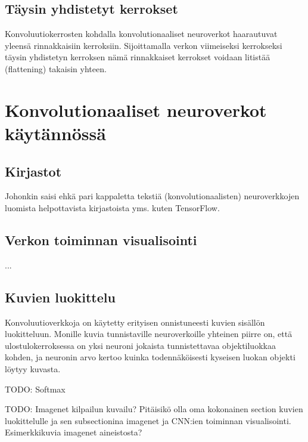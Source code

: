 \documentclass[finnish]{tktltiki2}
\theoremstyle{definition}
\theoremstyle{remark}
\begin{document}
    \subsection{Täysin yhdistetyt kerrokset}
    Konvoluutiokerrosten kohdalla konvolutionaaliset neuroverkot haarautuvat yleensä rinnakkaisiin kerroksiin. Sijoittamalla verkon viimeiseksi kerrokseksi täysin yhdistetyn kerroksen nämä rinnakkaiset kerrokset voidaan litistää (flattening) takaisin yhteen.

  \section{Konvolutionaaliset neuroverkot käytännössä}

    \subsection{Kirjastot}
    Johonkin saisi ehkä pari kappaletta tekstiä (konvolutionaalisten) neuroverkkojen luomista helpottavista kirjastoista yms. kuten TensorFlow.
    
  \subsection{Verkon toiminnan visualisointi}
  ... \cite{visualizing-convolutional}

  \subsection{Kuvien luokittelu}
    Konvoluutioverkkoja on käytetty erityisen onnistuneesti kuvien sisällön luokitteluun. Monille kuvia tunnistaville neuroverkoille yhteinen piirre on, että ulostulokerroksessa on yksi neuroni jokaista tunnistettavaa objektiluokkaa kohden, ja neuronin arvo kertoo kuinka todennäköisesti kyseisen luokan objekti löytyy kuvasta.

    TODO: Softmax


    TODO: Imagenet kilpailun kuvailu? Pitäisikö olla oma kokonainen section kuvien luokittelulle ja sen subsectionina imagenet ja CNN:ien toiminnan visualisointi. Esimerkkikuvia imagenet aineistosta?
\end{document}
